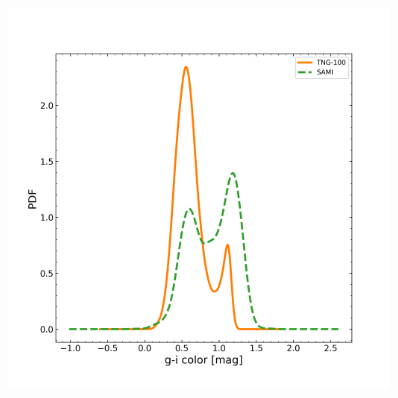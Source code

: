 \begin{figure}
    \centering
    \caption{}
    \label{pdf_color_res1}
\end{figure}

\begin{figure}
    \centering
    \includegraphics[width=0.9\textwidth]{images/results_pdf_g_i_band.png}
    \caption{}
    \label{pdf_color_res2}
\end{figure}

